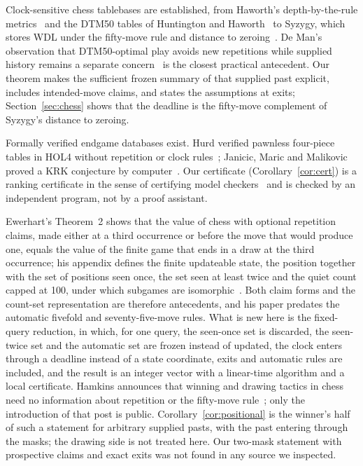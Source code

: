 \documentclass[journal]{IEEEtran}
\theoremstyle{definition}
\theoremstyle{remark}
\begin{document}
Clock-sensitive chess tablebases are established, from Haworth's depth-by-the-rule metrics~\cite{haworth2000,haworth2001} and the DTM50 tables of Huntington and Haworth~\cite{huntington2015} to Syzygy, which stores WDL under the fifty-move rule and distance to zeroing~\cite{syzygy}. De Man's observation that DTM50-optimal play avoids new repetitions while supplied history remains a separate concern~\cite{deman2018} is the closest practical antecedent. Our theorem makes the sufficient frozen summary of that supplied past explicit, includes intended-move claims, and states the assumptions at exits; Section~\ref{sec:chess} shows that the deadline is the fifty-move complement of Syzygy's distance to zeroing.

Formally verified endgame databases exist. Hurd verified pawnless four-piece tables in HOL4 without repetition or clock rules~\cite{hurd2005}; Janicic, Maric and Malikovic proved a KRK conjecture by computer~\cite{janicic2019}. Our certificate (Corollary~\ref{cor:cert}) is a ranking certificate in the sense of certifying model checkers~\cite{namjoshi2001} and is checked by an independent program, not by a proof assistant.

Ewerhart's Theorem~2 shows that the value of chess with optional repetition claims, made either at a third occurrence or before the move that would produce one, equals the value of the finite game that ends in a draw at the third occurrence; his appendix defines the finite updateable state, the position together with the set of positions seen once, the set seen at least twice and the quiet count capped at 100, under which subgames are isomorphic~\cite{ewerhart2002}. Both claim forms and the count-set representation are therefore antecedents, and his paper predates the automatic fivefold and seventy-five-move rules. What is new here is the fixed-query reduction, in which, for one query, the seen-once set is discarded, the seen-twice set and the automatic set are frozen instead of updated, the clock enters through a deadline instead of a state coordinate, exits and automatic rules are included, and the result is an integer vector with a linear-time algorithm and a local certificate. Hamkins announces that winning and drawing tactics in chess need no information about repetition or the fifty-move rule~\cite{hamkins2025}; only the introduction of that post is public. Corollary~\ref{cor:positional} is the winner's half of such a statement for arbitrary supplied pasts, with the past entering through the masks; the drawing side is not treated here. Our two-mask statement with prospective claims and exact exits was not found in any source we inspected.
\end{document}
